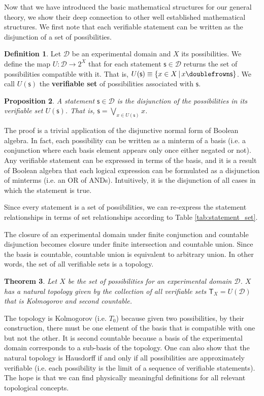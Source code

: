 \documentclass[%
reprint,
amsmath,amssymb,
aps,
prx,
]{revtex4-1}
\theoremstyle{plain}%
\newtheorem{thrm}{Theorem}[section]
\newtheorem{prop}[thrm]{Proposition}
\theoremstyle{definition}
\newtheorem{defn}[thrm]{Definition}
\theoremstyle{remark}
\def\comp{\doublefrown}
\def\bigOR{\bigvee}
\newcommand{\obs}[1][s] {\mathsf{#1}}
\newcommand{\edomain}[1][D] {\mathcal{#1}}
\begin{document}
Now that we have introduced the basic mathematical structures for our general theory, we show their deep connection to other well established mathematical structures. We first note that each verifiable statement can be written as the disjunction of a set of possibilities.

\begin{defn}
	Let $\edomain$ be an experimental domain and $X$ its possibilities. We define the map $U : \edomain \rightarrow 2^X$ that for each statement $\obs \in \edomain$ returns the set of possibilities compatible with it. That is, $U(\obs)\equiv\{ x \in X \, | \, x \comp \obs\}$. We call $U(\obs)$ the \textbf{verifiable set} of possibilities associated with $\obs$.
\end{defn}

\begin{prop}
	A statement $\obs \in \edomain$ is the disjunction of the possibilities in its verifiable set $U(\obs)$. That is, $\obs=\bigOR\limits_{x \in U(\obs)} x$.
\end{prop}

The proof is a trivial application of the disjunctive normal form of Boolean algebra. In fact, each possibility can be written as a minterm of a basis (i.e. a conjunction where each basis element appears only once either negated or not). Any verifiable statement can be expressed in terms of the basis, and it is a result of Boolean algebra that each logical expression can be formulated as a disjunction of minterms (i.e. an OR of ANDs). Intuitively, it is the disjunction of all cases in which the statement is true.

Since every statement is a set of possibilities, we can re-express the statement relationships in terms of set relationships according to Table \ref{tab:statement_set}.

The closure of an experimental domain under finite conjunction and countable disjunction becomes closure under finite intersection and countable union. Since the basis is countable, countable union is equivalent to arbitrary union. In other words, the set of all verifiable sets is a topology.

\begin{thrm}
	Let $X$ be the set of possibilities for an experimental domain $\edomain$. $X$ has a natural topology given by the collection of all verifiable sets $\mathsf{T}_X=U(\edomain)$ that is Kolmogorov and second countable.
\end{thrm}

The topology is Kolmogorov (i.e. $T_0$) because given two possibilities, by their construction, there must be one element of the basis that is compatible with one but not the other. It is second countable because a basis of the experimental domain corresponds to a sub-basis of the topology. One can also show that the natural topology is Hausdorff if and only if all possibilities are approximately verifiable (i.e. each possibility is the limit of a sequence of verifiable statements). The hope is that we can find physically meaningful definitions for all relevant topological concepts.
\end{document}
